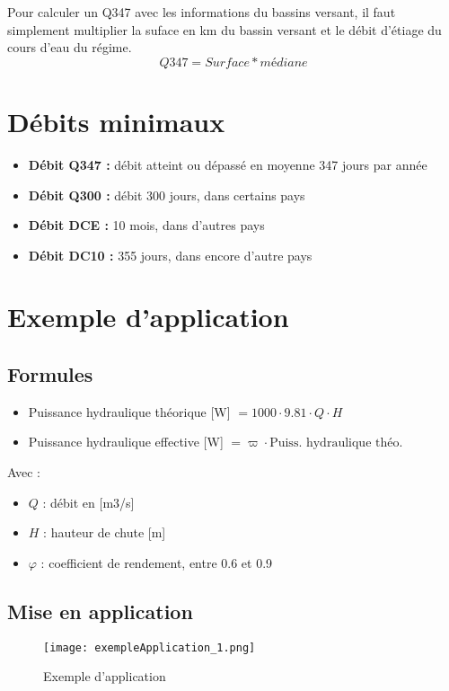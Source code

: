 \begin{figure}[H]
    \hfill
\end{figure}

Pour calculer un Q347 avec les informations du bassins versant, il faut simplement multiplier la suface en km du bassin versant et le débit d'étiage du cours d'eau du régime.
\begin{equation}
    Q347 = Surface * médiane
\end{equation}

\section{Débits minimaux}
\begin{itemize}
    \item \textbf{Débit Q347 :} débit atteint ou dépassé en moyenne 347 jours par année
    \item \textbf{Débit Q300 :} débit 300 jours, dans certains pays
    \item \textbf{Débit DCE :} 10 mois, dans d'autres pays
    \item \textbf{Débit DC10 :} 355 jours, dans encore d'autre pays
\end{itemize}

\section{Exemple d'application}
\subsection{Formules}
\begin{itemize}
    \item Puissance hydraulique théorique [W] $= 1000 \cdot 9.81 \cdot Q \cdot H$
    \item Puissance hydraulique effective [W] $= \varpi \cdot \text{Puiss. hydraulique théo.}$
\end{itemize}
Avec :
\begin{itemize}
    \item $Q$ : débit en [m3/s]
    \item $H$ : hauteur de chute [m]
    \item $\varphi$ : coefficient de rendement, entre 0.6 et 0.9
\end{itemize}

\subsection{Mise en application}
\begin{figure}[H]
    \centering
    \texttt{[image: exempleApplication\_1.png]}
    \caption{Exemple d'application}
\end{figure}

